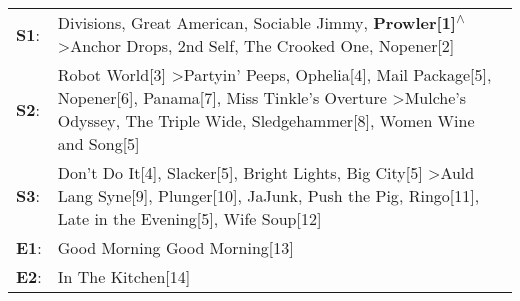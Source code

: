 \begin{supertabular}{p{0.03\textwidth}p{0.92\textwidth}}
 \textbf{S1}:  &                                                                                                                                                          Divisions\textsuperscript{}, \enspace Great American\textsuperscript{}, \enspace Sociable Jimmy\textsuperscript{}, \enspace \textbf{Prowler[1]\textsuperscript{$\wedge$}} \textgreater \enspace Anchor Drops\textsuperscript{}, \enspace 2nd Self\textsuperscript{}, \enspace The Crooked One\textsuperscript{}, \enspace Nopener[2]\textsuperscript{}  \enspace  \\
 \textbf{S2}:  &  Robot World[3]\textsuperscript{} \textgreater \enspace Partyin' Peeps\textsuperscript{}, \enspace Ophelia[4]\textsuperscript{}, \enspace Mail Package[5]\textsuperscript{}, \enspace Nopener[6]\textsuperscript{}, \enspace Panama[7]\textsuperscript{}, \enspace Miss Tinkle's Overture\textsuperscript{} \textgreater \enspace Mulche's Odyssey\textsuperscript{}, \enspace The Triple Wide\textsuperscript{}, \enspace Sledgehammer[8]\textsuperscript{}, \enspace Women Wine and Song[5]\textsuperscript{}  \enspace  \\
 \textbf{S3}:  &                                                                 Don't Do It[4]\textsuperscript{}, \enspace Slacker[5]\textsuperscript{}, \enspace Bright Lights, Big City[5]\textsuperscript{} \textgreater \enspace Auld Lang Syne[9]\textsuperscript{}, \enspace Plunger[10]\textsuperscript{}, \enspace JaJunk\textsuperscript{}, \enspace Push the Pig\textsuperscript{}, \enspace Ringo[11]\textsuperscript{}, \enspace Late in the Evening[5]\textsuperscript{}, \enspace Wife Soup[12]\textsuperscript{}  \enspace  \\
 \textbf{E1}:  &                                                                                                                                                                                                                                                                                                                                                                                                                                                                 Good Morning Good Morning[13]\textsuperscript{}  \enspace  \\
 \textbf{E2}:  &                                                                                                                                                                                                                                                                                                                                                                                                                                                                            In The Kitchen[14]\textsuperscript{}  \enspace  \\
\end{supertabular}
